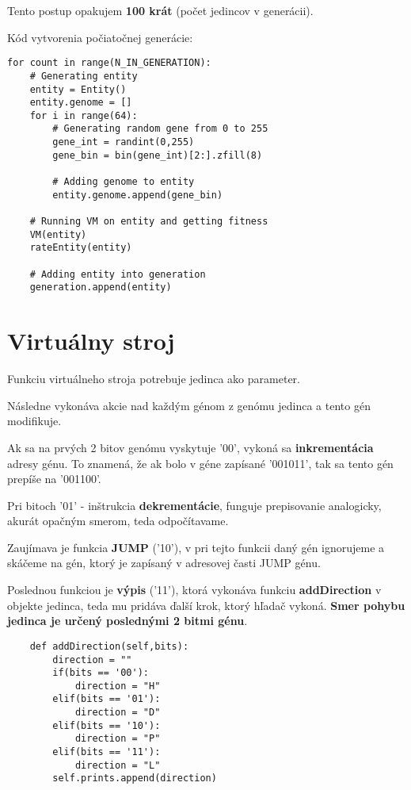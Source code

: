 \documentclass[10pt,oneside,slovak,a4paper]{article}
\begin{document}
Tento postup opakujem \textbf{100 krát} (počet jedincov v generácii).

Kód vytvorenia počiatočnej generácie:
\begin{lstlisting}
for count in range(N_IN_GENERATION):
    # Generating entity
    entity = Entity()
    entity.genome = []
    for i in range(64):
        # Generating random gene from 0 to 255
        gene_int = randint(0,255)
        gene_bin = bin(gene_int)[2:].zfill(8)

        # Adding genome to entity
        entity.genome.append(gene_bin)

    # Running VM on entity and getting fitness
    VM(entity)
    rateEntity(entity)
    
    # Adding entity into generation
    generation.append(entity)
\end{lstlisting}

\section{Virtuálny stroj}

Funkciu virtuálneho stroja potrebuje jedinca ako parameter.

Následne vykonáva akcie nad každým génom z genómu jedinca a tento gén modifikuje.

Ak sa na prvých 2 bitov genómu vyskytuje '00', vykoná sa \textbf{inkrementácia} adresy génu.
To znamená, že ak bolo v géne zapísané '001011', tak sa tento gén prepíše na '001100'.

Pri bitoch '01' - inštrukcia \textbf{dekrementácie}, funguje prepisovanie analogicky, akurát opačným smerom, teda odpočítavame.

Zaujímava je funkcia \textbf{JUMP} ('10'), v pri tejto funkcii daný gén ignorujeme a skáčeme na gén, ktorý je zapísaný v adresovej časti JUMP génu.
	
Poslednou funkciou je \textbf{výpis} ('11'), ktorá vykonáva funkciu \textbf{addDirection} v objekte jedinca, teda mu pridáva ďalší krok, ktorý hľadač vykoná.
\textbf{Smer pohybu jedinca je určený poslednými 2 bitmi génu}. 

\begin{lstlisting}
    def addDirection(self,bits):
        direction = ""
        if(bits == '00'):
            direction = "H"
        elif(bits == '01'):
            direction = "D"
        elif(bits == '10'):
            direction = "P"
        elif(bits == '11'):
            direction = "L"
        self.prints.append(direction)
\end{lstlisting} 
\end{document}
